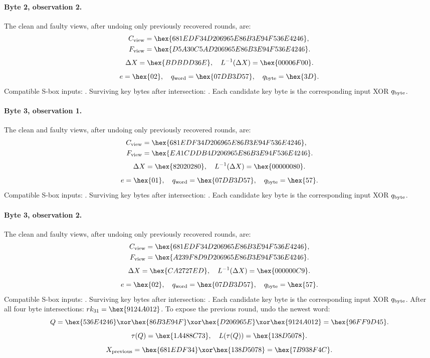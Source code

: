 \paragraph{Byte 2, observation 2.}
The clean and faulty views, after undoing only previously recovered rounds, are:
\[\begin{aligned}C_{\rm view}&=\hex{681EDF34D206965E86B3E94F536E4246},\\F_{\rm view}&=\hex{D5A30C5AD206965E86B3E94F536E4246}.\end{aligned}\]
\[\Delta X=\hex{BDBDD36E},\quad L^{-1}(\Delta X)=\hex{00006F00}.\]
\[e=\hex{02},\quad q_{\rm word}=\hex{07DB3D57},\quad q_{\rm byte}=\hex{3D}.\]
Compatible S-box inputs: . Surviving key bytes after intersection: . Each candidate key byte is the corresponding input XOR $q_{\rm byte}$.
\paragraph{Byte 3, observation 1.}
The clean and faulty views, after undoing only previously recovered rounds, are:
\[\begin{aligned}C_{\rm view}&=\hex{681EDF34D206965E86B3E94F536E4246},\\F_{\rm view}&=\hex{EA1CDDB4D206965E86B3E94F536E4246}.\end{aligned}\]
\[\Delta X=\hex{82020280},\quad L^{-1}(\Delta X)=\hex{00000080}.\]
\[e=\hex{01},\quad q_{\rm word}=\hex{07DB3D57},\quad q_{\rm byte}=\hex{57}.\]
Compatible S-box inputs: . Surviving key bytes after intersection: . Each candidate key byte is the corresponding input XOR $q_{\rm byte}$.
\paragraph{Byte 3, observation 2.}
The clean and faulty views, after undoing only previously recovered rounds, are:
\[\begin{aligned}C_{\rm view}&=\hex{681EDF34D206965E86B3E94F536E4246},\\F_{\rm view}&=\hex{A239F8D9D206965E86B3E94F536E4246}.\end{aligned}\]
\[\Delta X=\hex{CA2727ED},\quad L^{-1}(\Delta X)=\hex{000000C9}.\]
\[e=\hex{02},\quad q_{\rm word}=\hex{07DB3D57},\quad q_{\rm byte}=\hex{57}.\]
Compatible S-box inputs: . Surviving key bytes after intersection: . Each candidate key byte is the corresponding input XOR $q_{\rm byte}$.
After all four byte intersections: $rk_{31}=\hex{9124A012}$.
To expose the previous round, undo the newest word:
\[Q=\hex{536E4246}\xor\hex{86B3E94F}\xor\hex{D206965E}\xor\hex{9124A012}=\hex{96FF9D45}.\]
\[\tau(Q)=\hex{1A488C73},\quad L(\tau(Q))=\hex{138D5078}.\]
\[X_{\rm previous}=\hex{681EDF34}\xor\hex{138D5078}=\hex{7B938F4C}.\]
